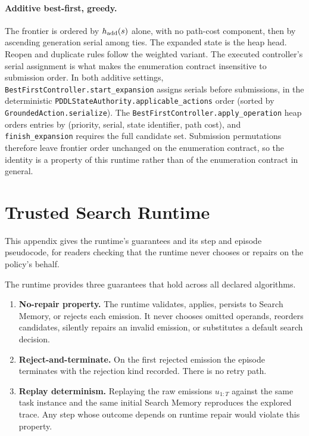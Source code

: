 \paragraph{Additive best-first, greedy.}
The frontier is ordered by $h_{\rm add}(s)$ alone, with no path-cost component, then by ascending generation serial among ties. The expanded state is the heap head. Reopen and duplicate rules follow the weighted variant.
The executed controller's serial assignment is what makes the enumeration contract insensitive to submission order. In both additive settings, \texttt{BestFirstController.start\_expansion} assigns serials before submissions, in the deterministic \texttt{PDDLStateAuthority.applicable\_actions} order (sorted by \texttt{GroundedAction.serialize}). The \texttt{BestFirstController.apply\_operation} heap orders entries by (priority, serial, state identifier, path cost), and \texttt{finish\_expansion} requires the full candidate set. Submission permutations therefore leave frontier order unchanged on the enumeration contract, so the identity is a property of this runtime rather than of the enumeration contract in general.


\section{Trusted Search Runtime}
\label{app:runtime}

This appendix gives the runtime's guarantees and its step and episode pseudocode, for readers checking that the runtime never chooses or repairs on the policy's behalf.

The runtime provides three guarantees that hold across all declared algorithms.

\begin{enumerate}[leftmargin=*, itemsep=1pt, parsep=1pt]
\item \textbf{No-repair property.} The runtime validates, applies, persists to Search Memory, or rejects each emission. It never chooses omitted operands, reorders candidates, silently repairs an invalid emission, or substitutes a default search decision.
\item \textbf{Reject-and-terminate.} On the first rejected emission the episode terminates with the rejection kind recorded. There is no retry path.
\item \textbf{Replay determinism.} Replaying the raw emissions $u_{1:T}$ against the same task instance and the same initial Search Memory reproduces the explored trace. Any step whose outcome depends on runtime repair would violate this property.
\end{enumerate}

